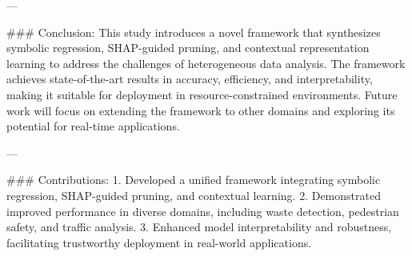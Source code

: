 ---

### Conclusion:
This study introduces a novel framework that synthesizes symbolic regression, SHAP-guided pruning, and contextual representation learning to address the challenges of heterogeneous data analysis. The framework achieves state-of-the-art results in accuracy, efficiency, and interpretability, making it suitable for deployment in resource-constrained environments. Future work will focus on extending the framework to other domains and exploring its potential for real-time applications.

---

### Contributions:
1. Developed a unified framework integrating symbolic regression, SHAP-guided pruning, and contextual learning.
2. Demonstrated improved performance in diverse domains, including waste detection, pedestrian safety, and traffic analysis.
3. Enhanced model interpretability and robustness, facilitating trustworthy deployment in real-world applications.